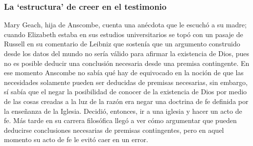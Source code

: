 \subsubsection{La `estructura' de creer en el testimonio}

Mary Geach, hija de Anscombe, cuenta una anécdota que le escuchó a su madre; cuando Elizabeth estaba en sus estudios universitarios se topó con un pasaje de Russell en su comentario de Leibniz que sostenía que un argumento construido desde los datos del mundo no sería válido para afirmar la existencia de Dios, pues no es posible deducir una conclusión necesaria desde una premisa contingente. En ese momento Anscombe no sabía qué hay de equivocado en la noción de que las necesidades solamente pueden ser deducidas de premisas necesarias, sin embargo, sí sabía que el negar la posibilidad de conocer de la existencia de Dios por medio de las cosas creadas a la luz de la razón era negar una doctrina de fe definida por la enseñanza de la Iglesia. Decidió, entonces, ir a una iglesia y hacer un acto de fe. Más tarde en su carrera filosófica llegó a ver cómo argumentar que pueden deducirse conclusiones necesarias de premisas contingentes, pero en aquel momento su acto de fe le evitó caer en un error.


